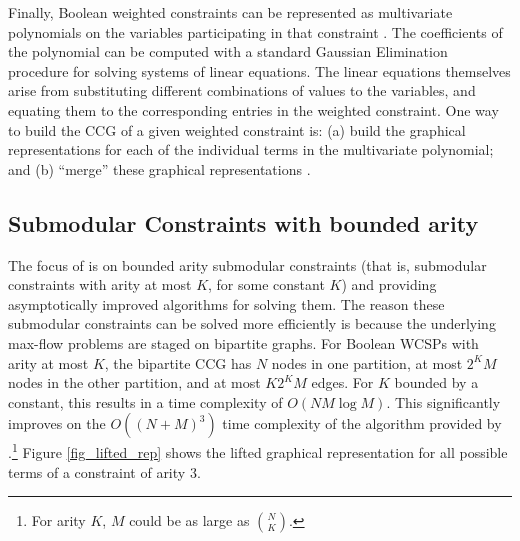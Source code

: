   Finally, Boolean weighted constraints can be represented as multivariate polynomials on the variables participating in that constraint \cite{ZSH:CSC:10,K:CP:08}. The coefficients of the polynomial can be computed with a standard Gaussian Elimination procedure for solving systems of linear equations. The linear equations themselves arise from substituting different combinations of values to the variables, and equating them to the corresponding entries in the weighted constraint. One way to build the CCG of a given weighted constraint is: (a) build the graphical representations for each of the individual terms in the multivariate polynomial; and (b) ``merge'' these graphical representations \cite{K:CP:08}.

\subsection{Submodular Constraints with bounded arity}
  The focus of \cite{KCK:SARA:13} is on bounded arity submodular constraints (that is, submodular constraints with arity at most $K$, for some constant $K$) and providing asymptotically improved algorithms for solving them. The reason these submodular constraints can be solved more efficiently is because the underlying max-flow problems are staged on bipartite graphs. For Boolean WCSPs with arity at most $K$, the bipartite CCG has $N$ nodes in one partition, at most $2^K M$ nodes in the other partition, and at most $K 2^K M$ edges. For $K$ bounded by a constant, this results in a time complexity of $O(N M \log M)$. This significantly improves on the $O((N+M)^{3})$ time complexity of the algorithm provided by \cite{ZSH:CSC:10}.\footnote{For arity $K$, $M$ could be as large as $N \choose K$.} Figure \ref{fig_lifted_rep} shows the lifted graphical representation for all possible terms of a constraint of arity $3$.
  
